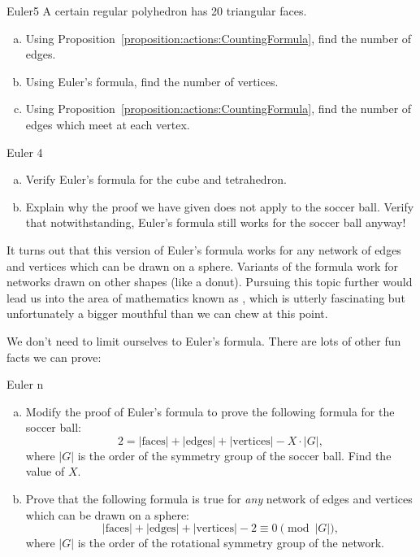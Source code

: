 \begin{exercise}{Euler5}
A certain regular polyhedron has 20 triangular faces. 
\begin{enumerate}[(a)]
\item
Using Proposition~\ref{proposition:actions:CountingFormula}, find the number of edges.
\item
Using Euler's formula, find the number of vertices.
\item
Using Proposition~\ref{proposition:actions:CountingFormula}, find the number of edges which meet at each vertex.
\end{enumerate}
\end {exercise}

\begin{exercise}{Euler 4}
\begin{enumerate}[(a)]
\item Verify Euler's formula for the cube and tetrahedron.
\item Explain why the proof we have given does not apply to the soccer ball. Verify that notwithstanding, Euler's formula still works for the soccer ball anyway! 
\end{enumerate}
\end {exercise}


It turns out that this version of Euler's formula works for any network of edges and vertices which can be drawn on a sphere. Variants of the formula work for networks drawn on other shapes (like a donut).  Pursuing this topic further would lead us into the area  of mathematics known as , which is utterly fascinating but unfortunately a bigger mouthful than we can chew at this point. 

We don't need to limit ourselves to Euler's formula.  There are lots of other fun facts we can prove:

\begin{exercise}{Euler n}
\begin{enumerate}[(a)]
\item Modify the proof of Euler's formula to prove the following formula for the soccer ball:
\[2 =  |\text{faces}| + |\text{edges}| + |\text{vertices}| - X \cdot |G|,\]
where $|G|$ is the order of the symmetry group of the soccer ball.  Find the value of $X$.
\item 
Prove that the following formula is true for \emph{any} network of edges and vertices which can be drawn on a sphere:
\[ |\text{faces}| + |\text{edges}| + |\text{vertices}| -2 \equiv 0 \pmod{|G|},\]
where $|G|$ is the order of the rotational symmetry group of the network.
\end{enumerate}
\end{exercise}


